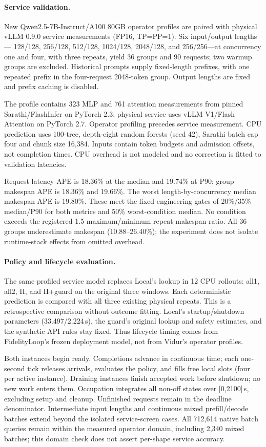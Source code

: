\paragraph{Service validation.}
New Qwen2.5-7B-Instruct/A100 80GB operator profiles are paired with physical
vLLM 0.9.0 service measurements (FP16, TP=PP=1). Six input/output lengths---
128/128, 256/128, 512/128, 1024/128, 2048/128, and 256/256---at concurrency
one and four, with three repeats, yield 36 groups and 90 requests; two
warmup groups are excluded. Historical prompts supply fixed-length prefixes,
with one repeated prefix in the four-request 2048-token group. Output lengths
are fixed and prefix caching is disabled.

The profile contains 323 MLP and 761 attention measurements from pinned
Sarathi/FlashInfer on PyTorch 2.3; physical service uses vLLM V1/Flash Attention
on PyTorch 2.7. Operator profiling precedes service measurement. CPU prediction
uses 100-tree, depth-eight random forests (seed 42), Sarathi batch cap four
and chunk size 16,384. Inputs contain token budgets and admission offsets,
not completion times. CPU overhead is not modeled and no correction is
fitted to validation latencies.

Request-latency APE is 18.36\% at the median and 19.74\% at P90; group
makespan APE is 18.36\% and 19.66\%. The worst length-by-concurrency median
makespan APE is 19.80\%. These meet the fixed engineering gates of
20\%/35\% median/P90 for both metrics and 50\% worst-condition median.
No condition exceeds the registered 1.5 maximum/minimum repeat-makespan ratio.
All 36 groups underestimate makespan (10.88--26.40\%); the experiment does
not isolate runtime-stack effects from omitted overhead.

\paragraph{Policy and lifecycle evaluation.}
The same profiled service model replaces Local's lookup in 12 CPU rollouts:
all1, all2, H, and H+guard on the original three windows. Each deterministic
prediction is compared with all three existing physical repeats. This is a
retrospective comparison without outcome fitting. Local's startup/shutdown
parameters (33.497/2.224\,s), the guard's original lookup and safety estimates,
and the synthetic API rules stay fixed. Thus lifecycle timing comes from
FidelityLoop's frozen deployment model, not from Vidur's operator profiles.

Both instances begin ready. Completions advance in continuous time; each
one-second tick releases arrivals, evaluates the policy, and fills free local
slots (four per active instance). Draining instances finish accepted work
before shutdown; no new work enters them. Occupation integrates all non-off
states over [0,2100]\,s, excluding setup and cleanup. Unfinished requests
remain in the deadline denominator. Intermediate input lengths and continuous
mixed prefill/decode batches extend beyond the isolated service-screen cases.
All 712,614 native batch queries remain within the measured operator domain,
including 2,340 mixed batches; this domain check does not assert per-shape
service accuracy.

